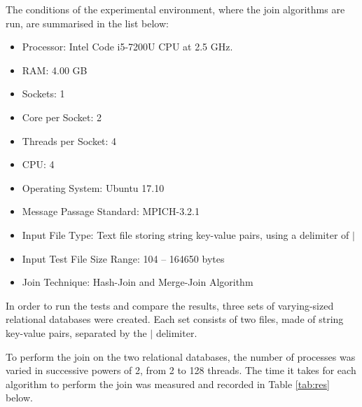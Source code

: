 \documentclass[journal,draftclsnofoot,11pt]{IEEEtran}
\begin{document}
The conditions of the experimental environment, where the join algorithms are run, are summarised in the list below:
\begin{itemize}
\item Processor: Intel Code i5-7200U CPU at 2.5 GHz.
\item RAM: 4.00 GB
\item Sockets: 1
\item Core per Socket: 2
\item Threads per Socket: 4
\item CPU: 4
\item Operating System: Ubuntu 17.10
\item Message Passage Standard: MPICH-3.2.1
\item Input File Type: Text file storing string key-value pairs, using a delimiter of $|$
\item Input Test File Size Range: 104 – 164650 bytes
\item Join Technique: Hash-Join and Merge-Join Algorithm
\end{itemize}

In order to run the tests and compare the results, three sets of varying-sized relational databases were created. Each set consists of two files, made of string key-value pairs, separated by the $|$ delimiter. 

To perform the join on the two relational databases, the number of processes was varied in successive powers of 2, from 2 to 128 threads. The time it takes for each algorithm to perform the join was measured and recorded in Table \ref{tab:res} below.

\end{document}
